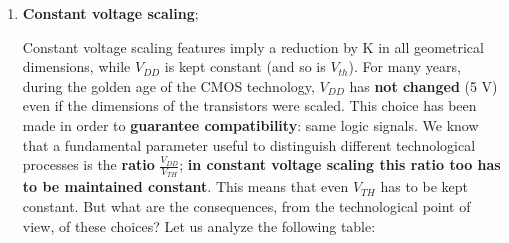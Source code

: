 \documentclass[a4paper, 12pt, twoside, openright]{report}
\begin{document}
\begin{enumerate}

\item \textbf{Constant voltage scaling};

Constant voltage scaling features imply a reduction by K in all geometrical dimensions, while $V_{DD}$ is kept constant (and so is $V_{th}$). For many years, during the golden age of the CMOS technology, $V_{DD}$ has \textbf{not changed} (5 V) even if the dimensions of the transistors were scaled. This choice has been made in order to \textbf{guarantee compatibility}: same logic signals. We know that a fundamental parameter useful to distinguish different technological processes is the \textbf{ratio} $\frac{V_{DD}}{V_{TH}}$; \textbf{in constant voltage scaling this ratio too has to be maintained constant}. This means that even $V_{TH}$ has to be kept constant. But what are the consequences, from the technological point of view, of these choices? Let us analyze the following table:


\end{enumerate}
\end{document}
